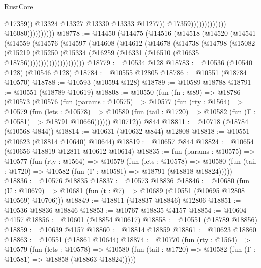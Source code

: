 \begin{lexlean}{RustCore}
\begin{coremodule}
                                                          @17359))
                                                      @13324
                                                      @13327
                                                      @13330
                                                      @13333
                                                      @11277))
                                                  @17359)))))))))))))
                        @16080))))))))))
@18778 := @14450
    (@14475
      (@14516
        (@14518
          (@14520
            (@14541
              (@14559
                (@14576
                  (@14597
                    (@14608
                      (@14612
                        (@14678
                          (@14738
                            (@14798
                              (@15082
                                (@15219
                                  (@15250
                                    (@15334
                                      (@16259 (@16331 (@16510 (@16635 @18756)))))))))))))))))))))
@18779 := @10534 @128
@18783 := @10536 (@10540 @128) (@10546 @128)
@18784 := @10555 @12805
@18786 := @10551 (@18784 @10570)
@18788 := @10593 (@10594 @128)
@18789 := @10589 @18788
@18791 := @10551 (@18789 @10619)
@18808 := @10550
    (fun (fn : @89) =>
    @18786
      (@10573
        (@10576
          (fun (params : @10575) =>
          @10577
            (fun (rty : @1564) =>
            @10579
              (fun (lets : @10578) =>
              @10580 (fun (tail : @1720) => @10582 (fun (Γ : @10581) => @18791 @10666))))))
        @10712))
    @844
@18811 := @10718 (@18784 (@10568 @844))
@18814 := @10631 (@10632 @844) @12808
@18818 := @10551 (@10623 (@18814 @10640) @10644)
@18819 := @10657 @844
@18824 := @10654 (@10656 @18819 @12811 @10612 @10614)
@18835 := fun (params : @10575) =>
  @10577
    (fun (rty : @1564) =>
    @10579
      (fun (lets : @10578) =>
      @10580 (fun (tail : @1720) => @10582 (fun (Γ : @10581) => @18791 (@18818 @18824)))))
@18836 := @10576 @18835
@18837 := @10573 @18836
@18846 := @10680
    (fun (U : @10679) => @10681 (fun (t : @7) => @10689 (@10551 (@10695 @12808 @10569) @10706)))
@18849 := @18811 (@18837 @18846) @12806
@18851 := @10536 @18836 @18846
@18853 := @10767 @18835 @4157
@18854 := @10604 @4157
@18856 := @10601 (@18854 @10617)
@18858 := @10551 (@18789 @18856)
@18859 := @10639 @4157
@18860 := @18814 @18859
@18861 := @10623 @18860
@18863 := @10551 (@18861 @10644)
@18874 := @10770
    (fun (rty : @1564) =>
    @10579
      (fun (lets : @10578) =>
      @10580 (fun (tail : @1720) => @10582 (fun (Γ : @10581) => @18858 (@18863 @18824)))))

\end{coremodule}
\end{lexlean}
